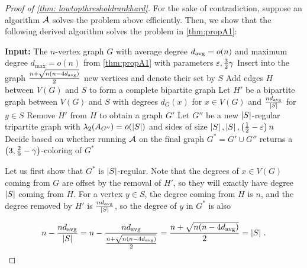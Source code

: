 \begin{proof}[Proof of \cref{thm: lowtopthresholdrankhard}]
    For the sake of contradiction, suppose an algorithm $\mathcal{A}$ solves the problem above efficiently.
    Then, we show that the following derived algorithm solves the problem in \cref{thm:propA1}:

    \begin{algorithm}[H]
        \caption{Low top-threshold rank hardness algorithm}
        \label{alg: lowtopthresholdrankhard}
        \DontPrintSemicolon
        \textbf{Input:} The $n$-vertex graph $G$ with average degree $d_{\operatorname{avg}} = o(n)$ and maximum degree $d_{\max} = o(n)$ from \cref{thm:propA1} with parameters $\varepsilon, \frac{3}{2}\gamma$\;
        Insert into the graph $\frac{n+\sqrt{n(n-4d_{\operatorname{avg}})}}{2}$ new vertices and denote their set by $S$\;
        Add edges $H$ between $V(G)$ and $S$ to form a complete bipartite graph\;
        Let $H'$ be a bipartite graph between $V(G)$ and $S$ with degrees $d_G(x)$ for $x\in V(G)$ and $\frac{nd_{\operatorname{avg}}}{\left\lvert S\right\rvert}$ for $y\in S$\;
        Remove $H'$ from $H$ to obtain a graph $G'$\;
        Let $G''$ be a new $\left\lvert S\right\rvert$-regular tripartite graph with $\lambda_2(A_{G''})=o(\left\lvert S\right\rvert)$ and sides of size $\left\lvert S\right\rvert, \left\lvert S\right\rvert, \left(\frac{1}{2} - \varepsilon\right)n\;$\footnotemark{}\;
        Decide based on whether running $\mathcal{A}$ on the final graph $G^* = G' \cup G''$ returns a $\left(3, \frac{2}{9}-\gamma\right)$-coloring of $G^*$\;
    \end{algorithm}

    Let us first show that $G^*$ is $\left\lvert S\right\rvert$-regular. Note that the degrees of $x\in V(G)$ coming from $G$ are offset by the removal of $H'$, so they will exactly have degree $\left\lvert S\right\rvert$ coming from $H$. For a vertex $y\in S$, the degree coming from $H$ is $n$, and the degree removed by $H'$ is $\frac{nd_{\operatorname{avg}}}{\left\lvert S\right\rvert}$, so the degree of $y$ in $G^*$ is also
        
    $$n-\frac{nd_{\operatorname{avg}}}{\left\lvert S\right\rvert}=n-\frac{nd_{\operatorname{avg}}}{\frac{n+\sqrt{n(n-4d_{\operatorname{avg}})}}{2}}=\frac{n+\sqrt{n(n-4d_{\operatorname{avg}})}}{2}=\left\lvert S\right\rvert\,.$$



\end{proof}
